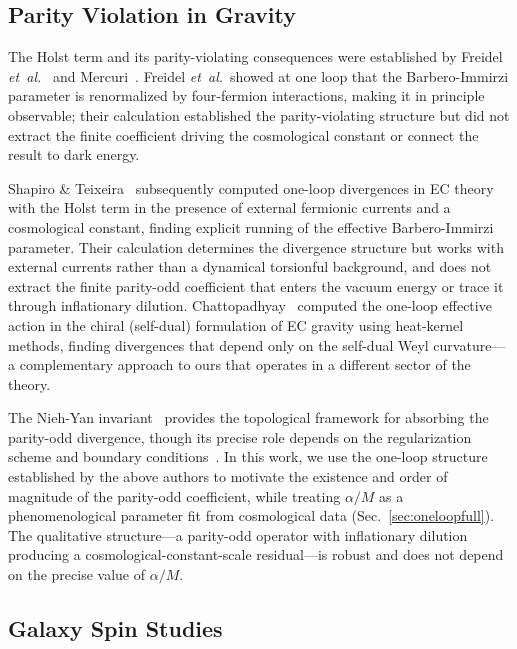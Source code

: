 \documentclass[aps,prd,twocolumn,superscriptaddress,showpacs,preprintnumbers,nofootinbib,longbibliography,floatfix]{revtex4-2}
\newcommand{\etal}{\textit{et~al.}}
\begin{document}
\subsection{Parity Violation in Gravity}

The Holst term and its parity-violating consequences were established by Freidel \etal~\cite{Freidel2005} and Mercuri~\cite{Mercuri2006,Mercuri2009}. Freidel \etal\ showed at one loop that the Barbero-Immirzi parameter is renormalized by four-fermion interactions, making it in principle observable; their calculation established the parity-violating structure but did not extract the finite coefficient driving the cosmological constant or connect the result to dark energy.

Shapiro \& Teixeira~\cite{ShapiroTeixeira2014} subsequently computed one-loop divergences in EC theory with the Holst term in the presence of external fermionic currents and a cosmological constant, finding explicit running of the effective Barbero-Immirzi parameter. Their calculation determines the divergence structure but works with external currents rather than a dynamical torsionful background, and does not extract the finite parity-odd coefficient that enters the vacuum energy or trace it through inflationary dilution. Chattopadhyay~\cite{Chattopadhyay2023} computed the one-loop effective action in the chiral (self-dual) formulation of EC gravity using heat-kernel methods, finding divergences that depend only on the self-dual Weyl curvature---a complementary approach to ours that operates in a different sector of the theory.

The Nieh-Yan invariant~\cite{NiehYan1982} provides the topological framework for absorbing the parity-odd divergence, though its precise role depends on the regularization scheme and boundary conditions~\cite{NiehYan1982}. In this work, we use the one-loop structure established by the above authors to motivate the existence and order of magnitude of the parity-odd coefficient, while treating $\alpha/M$ as a phenomenological parameter fit from cosmological data (Sec.~\ref{sec:oneloopfull}). The qualitative structure---a parity-odd operator with inflationary dilution producing a cosmological-constant-scale residual---is robust and does not depend on the precise value of $\alpha/M$.

\subsection{Galaxy Spin Studies}
\end{document}
